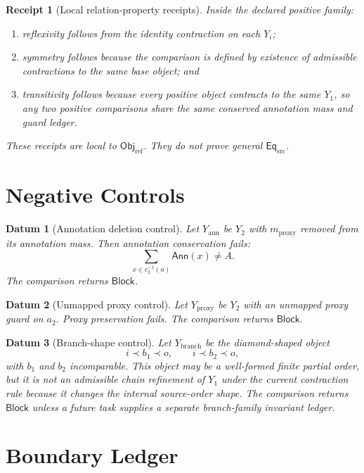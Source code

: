 \documentclass[11pt]{article}
\newcommand{\EqSrc}{\mathsf{Eq}_{\mathrm{src}}}
\newcommand{\ObjRef}{\mathsf{Obj}_{\mathrm{ref}}}
\newcommand{\Ann}{\mathsf{Ann}}
\newcommand{\Block}{\mathsf{Block}}
\newtheorem{datum}{Datum}
\newtheorem{receipt}{Receipt}
\begin{document}
\begin{receipt}[Local relation-property receipts]
Inside the declared positive family:
\begin{enumerate}
    \item reflexivity follows from the identity contraction on each
    \(Y_i\);
    \item symmetry follows because the comparison is defined by existence
    of admissible contractions to the same base object; and
    \item transitivity follows because every positive object contracts to
    the same \(Y_{1}\), so any two positive comparisons share the same
    conserved annotation mass and guard ledger.
\end{enumerate}
These receipts are local to \(\ObjRef\). They do not prove general
\(\EqSrc\).
\end{receipt}

\section{Negative Controls}

\begin{datum}[Annotation deletion control]
Let \(Y_{\mathrm{ann}}\) be \(Y_{2}\) with
\(m_{\mathrm{proxy}}\) removed from its annotation mass. Then annotation
conservation fails:
\[
    \sum_{x\in c_{2}^{-1}(a)} \Ann(x)\neq A.
\]
The comparison returns \(\Block\).
\end{datum}

\begin{datum}[Unmapped proxy control]
Let \(Y_{\mathrm{proxy}}\) be \(Y_{2}\) with an unmapped proxy guard on
\(a_{2}\). Proxy preservation fails. The comparison returns \(\Block\).
\end{datum}

\begin{datum}[Branch-shape control]
Let \(Y_{\mathrm{branch}}\) be the diamond-shaped object
\[
    i\prec b_{1}\prec o,\qquad i\prec b_{2}\prec o,
\]
with \(b_{1}\) and \(b_{2}\) incomparable. This object may be a well-formed
finite partial order, but it is not an admissible chain refinement of
\(Y_{1}\) under the current contraction rule because it changes the
internal source-order shape. The comparison returns \(\Block\) unless a
future task supplies a separate branch-family invariant ledger.
\end{datum}

\section{Boundary Ledger}
\end{document}
